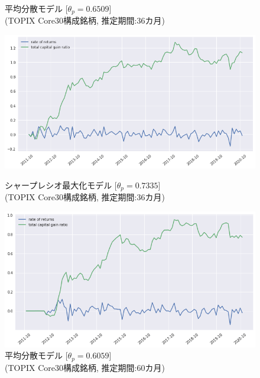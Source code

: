 \documentclass[dvipdfmx,autodetect-engine]{jsarticle}
\begin{document}
\begin{figure}[htbp]
\begin{minipage}{0.5\hsize}
\begin{center}
\end{center}
\caption{\small 平均分散モデル [$\theta_p=0.6509$]\\(TOPIX Core30構成銘柄, 推定期間:36カ月)}
\label{fig:21}
\end{minipage}
\begin{minipage}{0.5\hsize}
\begin{center}
\includegraphics[width=1.0\hsize]{./figures/srmp_tpx30_w=36_plot.png}
\end{center}
\caption{\small シャープレシオ最大化モデル [$\theta_p=0.7335$]\\(TOPIX Core30構成銘柄, 推定期間:36カ月)}
\label{fig:22}
\end{minipage}
\begin{minipage}{0.5\hsize}
\begin{center}
\includegraphics[width=1.0\hsize]{./figures/mmvp_tpx30_w=60_plot.png}
\end{center}
\caption{\small 平均分散モデル [$\theta_p=0.6059$]\\(TOPIX Core30構成銘柄, 推定期間:60カ月)}
\label{fig:31}
\end{minipage}

\end{figure}
\end{document}
